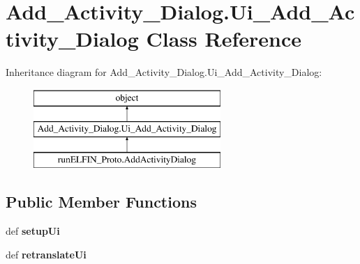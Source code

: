 \hypertarget{classAdd__Activity__Dialog_1_1Ui__Add__Activity__Dialog}{\section{Add\-\_\-\-Activity\-\_\-\-Dialog.\-Ui\-\_\-\-Add\-\_\-\-Activity\-\_\-\-Dialog Class Reference}
\label{classAdd__Activity__Dialog_1_1Ui__Add__Activity__Dialog}
}
Inheritance diagram for Add\-\_\-\-Activity\-\_\-\-Dialog.\-Ui\-\_\-\-Add\-\_\-\-Activity\-\_\-\-Dialog\-:\begin{figure}[H]
\begin{center}
\leavevmode
\includegraphics[height=3.000000cm]{classAdd__Activity__Dialog_1_1Ui__Add__Activity__Dialog}
\end{center}
\end{figure}
\subsection*{Public Member Functions}
\begin{DoxyCompactItemize}
\item 
\hypertarget{classAdd__Activity__Dialog_1_1Ui__Add__Activity__Dialog_acf37b8ba953fdc38c6f89f26ce922c61}{def {\bfseries setup\-Ui}}\label{classAdd__Activity__Dialog_1_1Ui__Add__Activity__Dialog_acf37b8ba953fdc38c6f89f26ce922c61}

\item 
\hypertarget{classAdd__Activity__Dialog_1_1Ui__Add__Activity__Dialog_a36b86b6a17f2dfce4268303d18cd22c1}{def {\bfseries retranslate\-Ui}}\label{classAdd__Activity__Dialog_1_1Ui__Add__Activity__Dialog_a36b86b6a17f2dfce4268303d18cd22c1}

\end{DoxyCompactItemize}
